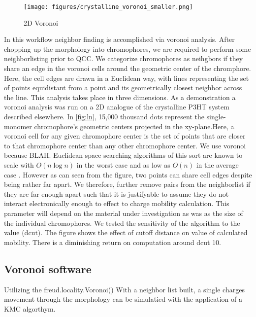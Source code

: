 \begin{figure}
  \center
  \texttt{[image: figures/crystalline\_voronoi\_smaller.png]} 
  \caption{2D Voronoi}
  \label{fig:2d}
\end{figure}

 In this workflow neighbor finding is accomplished via
voronoi analysis.
After chopping up the morphology into chromophores, we are required to perform some neighborlisting prior to
QCC. We categorize chromophores as
neihgbors if they share an edge in the voronoi cells around the geometric center of the chromphore. Here, the
cell edges are drawn in a Euclidean way, with lines representing the set of points equidistant from a point
and its geometrically closest neighbor across the line. This analysis takes place in three dimensions. As a
demonstration a voronoi analysis was run on a 2D analogue of the crystalline P3HT system described elsewhere.
In \autoref{fig:ln}, 15,000 thousand dots represent the single-monomer chromophore's geometric centers projected
in the xy-plane.Here,
a voronoi cell for any given chromophore center is the set of points that are closer to that chromophore
center than any other chromophore center. We use voronoi because BLAH. Euclidean space searching algorithms of
this sort are known to scale with $O(n\log{n})$ in the worst case and as low as $O(n)$ in the average case
\cite{Bentley1980}.
However as can seen from the figure, two points can share cell edges despite being rather far apart. We
therefore, further remove pairs from the neighborlist if they are far enough apart such that it is justifyable
to assume they do not interact electronically enough to effect to charge mobility calculation. This parameter will
depend on the material under investigation as was as the size of the individual chromophores. We tested the
sensitivity of the algorithm to the value (dcut). The figure shows the effect of cutoff distance on value of
calculated mobility. There is a diminishing return on computation around dcut 10. 


    \subsection{Voronoi software}

Utilizing the freud.locality.Voronoi() 
With a neighbor list built, a single charges movement through the morphology can be simulatied with the
application of a KMC algorthym.

